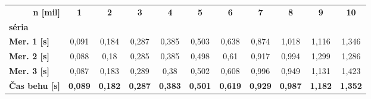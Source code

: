 \documentclass[12pt]{article}
\begin{document}
        \begin{table}[!h]
        \begin{tabular}{|l|c|c|c|c|c|c|c|c|c|c|}
        \hline
\multicolumn{1}{|r|}{\textbf{n {[}mil{]}}} & \multirow{2}{*}{\textbf{1}} & \multirow{2}{*}{\textbf{2}} & \multirow{2}{*}{\textbf{3}} & \multirow{2}{*}{\textbf{4}} & \multirow{2}{*}{\textbf{5}} & \multirow{2}{*}{\textbf{6}} & \multirow{2}{*}{\textbf{7}} & \multirow{2}{*}{\textbf{8}} & \multirow{2}{*}{\textbf{9}} & \multirow{2}{*}{\textbf{10}} \\ \cline{1-1}
\textbf{séria} &  &    &                             &                             &                             &                             &                             &                             &                             &                              \\ 
\hline
\textbf{Mer. 1 {[}s{]}}                    & 0,091                       & 0,184                       & 0,287                       & 0,385                       & 0,503                       & 0,638                       & 0,874                       & 1,018                       & 1,116                       & 1,346                        \\ \hline
\textbf{Mer. 2 {[}s{]}}                    & 0,088                       & 0,18                        & 0,285                       & 0,385                       & 0,498                       & 0,61                        & 0,917                       & 0,994                       & 1,299                       & 1,286                        \\ \hline
\textbf{Mer. 3 {[}s{]}}                    & 0,087                       & 0,183                       & 0,289                       & 0,38                        & 0,502                       & 0,608                       & 0,996                       & 0,949                       & 1,131                       & 1,423                        \\ \hline
\textbf{Čas behu {[}s{]}}                  & \textbf{0,089}              & \textbf{0,182}              & \textbf{0,287}              & \textbf{0,383}              & \textbf{0,501}              & \textbf{0,619}              & \textbf{0,929}              & \textbf{0,987}              & \textbf{1,182}              & \textbf{1,352}               \\ \hline
\end{tabular}
\end{table}
\end{document}
